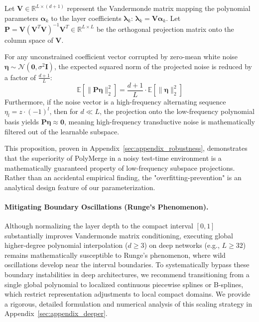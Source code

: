 \begin{proposition}
\label{prop:noise_filter}
Let $\mathbf{V} \in \mathbb{R}^{L \times (d+1)}$ represent the Vandermonde matrix mapping the polynomial parameters $\boldsymbol{\alpha}_k$ to the layer coefficients $\boldsymbol{\lambda}_k$: $\boldsymbol{\lambda}_k = \mathbf{V}\boldsymbol{\alpha}_k$. Let $\mathbf{P} = \mathbf{V}(\mathbf{V}^T \mathbf{V})^{-1} \mathbf{V}^T \in \mathbb{R}^{L \times L}$ be the orthogonal projection matrix onto the column space of $\mathbf{V}$. 

For any unconstrained coefficient vector corrupted by zero-mean white noise $\boldsymbol{\eta} \sim \mathcal{N}(\mathbf{0}, \sigma^2 \mathbf{I})$, the expected squared norm of the projected noise is reduced by a factor of $\frac{d+1}{L}$:
\begin{equation}
\mathbb{E}\left[ \|\mathbf{P} \boldsymbol{\eta}\|_2^2 \right] = \frac{d+1}{L} \cdot \mathbb{E}\left[ \|\boldsymbol{\eta}\|_2^2 \right]
\end{equation}
Furthermore, if the noise vector is a high-frequency alternating sequence $\eta_l = z \cdot (-1)^l$, then for $d \ll L$, the projection onto the low-frequency polynomial basis yields $\mathbf{P}\boldsymbol{\eta} \approx \mathbf{0}$, meaning high-frequency transductive noise is mathematically filtered out of the learnable subspace.
\end{proposition}

This proposition, proven in Appendix~\ref{sec:appendix_robustness}, demonstrates that the superiority of PolyMerge in a noisy test-time environment is a mathematically guaranteed property of low-frequency subspace projections. Rather than an accidental empirical finding, the "overfitting-prevention" is an analytical design feature of our parameterization.

\paragraph{Mitigating Boundary Oscillations (Runge's Phenomenon).} Although normalizing the layer depth to the compact interval $[0, 1]$ substantially improves Vandermonde matrix conditioning, executing global higher-degree polynomial interpolation ($d \ge 3$) on deep networks (e.g., $L \ge 32$) remains mathematically susceptible to Runge's phenomenon, where wild oscillations develop near the interval boundaries. To systematically bypass these boundary instabilities in deep architectures, we recommend transitioning from a single global polynomial to localized continuous piecewise splines or B-splines, which restrict representation adjustments to local compact domains. We provide a rigorous, detailed formulation and numerical analysis of this scaling strategy in Appendix~\ref{sec:appendix_deeper}.

